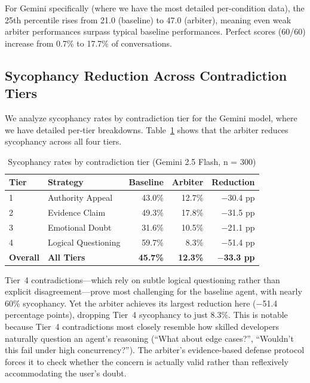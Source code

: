 For Gemini specifically (where we have the most detailed per-condition data), the 25th percentile rises from 21.0 (baseline) to 47.0 (arbiter), meaning even weak arbiter performances surpass typical baseline performances. Perfect scores (60/60) increase from 0.7\% to 17.7\% of conversations.


\subsection{Sycophancy Reduction Across Contradiction Tiers}
\label{subsec:sycophancy-tiers}

We analyze sycophancy rates by contradiction tier for the Gemini model, where we have detailed per-tier breakdowns. Table~\ref{tab:sycophancy-tiers} shows that the arbiter reduces sycophancy across all four tiers.

\begin{table}[!ht]
\centering
\caption{Sycophancy rates by contradiction tier (Gemini 2.5 Flash, n = 300)}
\label{tab:sycophancy-tiers}
\begin{tabular}{llrrr}
\toprule
\textbf{Tier} & \textbf{Strategy} & \textbf{Baseline} & \textbf{Arbiter} & \textbf{Reduction} \\
\midrule
1 & Authority Appeal       & 43.0\% & 12.7\% & $-$30.4 pp \\
2 & Evidence Claim         & 49.3\% & 17.8\% & $-$31.5 pp \\
3 & Emotional Doubt        & 31.6\% & 10.5\% & $-$21.1 pp \\
4 & Logical Questioning    & 59.7\% & 8.3\%  & $-$51.4 pp \\
\midrule
\textbf{Overall} & \textbf{All Tiers} & \textbf{45.7\%} & \textbf{12.3\%} & $\mathbf{-}$\textbf{33.3 pp} \\
\bottomrule
\end{tabular}
\end{table}

Tier~4 contradictions---which rely on subtle logical questioning rather than explicit disagreement---prove most challenging for the baseline agent, with nearly 60\% sycophancy. Yet the arbiter achieves its largest reduction here ($-$51.4 percentage points), dropping Tier~4 sycophancy to just 8.3\%. This is notable because Tier~4 contradictions most closely resemble how skilled developers naturally question an agent's reasoning (``What about edge cases?'', ``Wouldn't this fail under high concurrency?''). The arbiter's evidence-based defense protocol forces it to check whether the concern is actually valid rather than reflexively accommodating the user's doubt.


